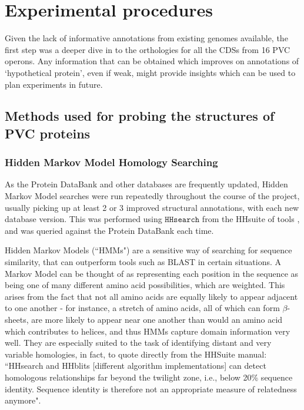\clearpage

\section{Experimental procedures}
Given the lack of informative annotations from existing genomes available, the first step was a deeper dive in to the orthologies for all the CDSs from 16 PVC operons. Any information that can be obtained which improves on annotations of `hypothetical protein', even if weak, might provide insights which can be used to plan experiments in future.
	 

\subsection{Methods used for probing the structures of PVC proteins}
\subsubsection{Hidden Markov Model Homology Searching}\label{hhresults}
As the Protein DataBank and other databases are frequently updated, Hidden Markov Model searches were run repeatedly throughout the course of the project, usually picking up at least 2 or 3 improved structural annotations, with each new database version. This was performed using $\mathtt{HHsearch}$ from the HHsuite of tools \citep{Remmert2012}, and was queried against the Protein DataBank each time.
	
Hidden Markov Models (``HMMs") are a sensitive way of searching for sequence similarity, that can outperform tools such as BLAST in certain situations. A Markov Model can be thought of as representing each position in the sequence as being one of many different amino acid possibilities, which are weighted. This arises from the fact that not all amino acids are equally likely to appear adjacent to one another - for instance, a stretch of amino acids, all of which can form $\beta$-sheets, are more likely to appear near one another than would an amino acid which contributes to helices, and thus HMMs capture domain information very well. They are especially suited to the task of identifying distant and very variable homologies, in fact, to quote directly from the HHSuite manual: ``HHsearch and HHblits [different algorithm implementations] can detect homologous relationships far beyond the twilight zone, i.e., below 20\% sequence identity. Sequence identity is therefore not an appropriate measure of relatedness anymore".

